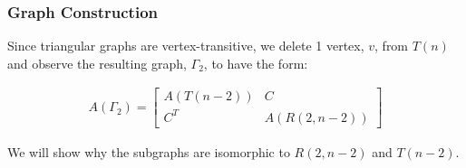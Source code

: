 \subsubsection{Graph Construction}
Since triangular graphs are vertex-transitive, we delete 1 vertex, $v$, from $T(n)$ and observe the resulting graph, $\Gamma_2$, to have the form:

\begin{align*}
    A(\Gamma_2) = \begin{bmatrix}
        A(T(n-2)) & C \\
        C^T & A(R(2,n-2))
    \end{bmatrix}
\end{align*}

We will show why the subgraphs are isomorphic to $R(2,n-2)$ and $T(n-2)$.


